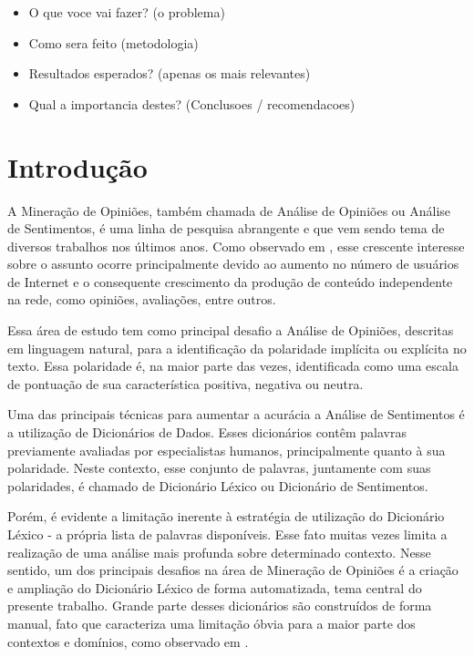 \documentclass[a4paper,11pt]{article}
\begin{document}
\begin{itemize}
\item{O que voce vai fazer? (o problema)}
\item{Como sera feito (metodologia)}
\item{Resultados esperados? (apenas os mais relevantes)}
\item{Qual a importancia destes? (Conclusoes / recomendacoes)}
\end{itemize}

\section{Introdução}

A Mineração de Opiniões, também chamada de Análise de Opiniões ou Análise de Sentimentos, é uma linha de pesquisa abrangente e que vem sendo tema de diversos trabalhos nos últimos anos. Como observado em \cite{liu2010multifaceted}, esse crescente interesse sobre o assunto ocorre principalmente devido ao aumento no número de usuários de Internet e o consequente crescimento da produção de conteúdo independente na rede, como opiniões, avaliações, entre outros. 

Essa área de estudo tem como principal desafio a Análise de Opiniões, descritas em linguagem natural, para a identificação da polaridade implícita ou explícita no texto. Essa polaridade é, na maior parte das vezes, identificada como uma escala de pontuação de sua característica positiva, negativa ou neutra.

Uma das principais técnicas para aumentar a acurácia a Análise de Sentimentos é a utilização de Dicionários de Dados. Esses dicionários contêm palavras previamente avaliadas por especialistas humanos, principalmente quanto à sua polaridade. Neste contexto, esse conjunto de palavras, juntamente com suas polaridades, é chamado de Dicionário Léxico ou Dicionário de Sentimentos. 

Porém, é evidente a limitação inerente à estratégia de utilização do Dicionário Léxico - a própria lista de palavras disponíveis. Esse fato muitas vezes limita a realização de uma análise mais profunda sobre determinado contexto. Nesse sentido, um dos principais desafios na área de Mineração de Opiniões é a criação e ampliação do Dicionário Léxico de forma automatizada, tema central do presente trabalho. Grande parte desses dicionários são construídos de forma manual, fato que caracteriza uma limitação óbvia para a maior parte dos contextos e domínios, como observado em \cite{duwairi2015detecting}. 
\end{document}
